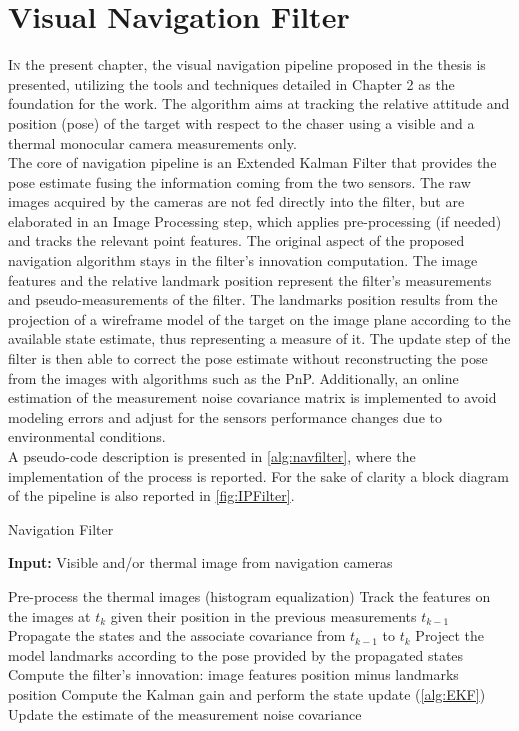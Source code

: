 \chapter{Visual Navigation Filter}
\vspace{-0.3cm}
\lettrine{I}{n} the present chapter, the visual navigation pipeline proposed in the thesis is presented, utilizing the tools and techniques detailed in Chapter 2 as the foundation for the work.
The algorithm aims at tracking the relative attitude and position (pose) of the target with respect to the chaser using a visible and a thermal monocular camera measurements only. \\
The core of navigation pipeline is an Extended Kalman Filter that provides the pose estimate fusing the information coming from the two sensors. The raw images acquired by the cameras are not fed directly into the filter, but are elaborated in an Image Processing step, which applies pre-processing (if needed) and tracks the relevant point features. The original aspect of the proposed navigation algorithm stays in the filter's innovation computation. The image features and the relative landmark position represent the filter's measurements and pseudo-measurements of the filter. The landmarks position results from the projection of a wireframe model of the target on the image plane according to the available state estimate, thus representing a measure of it. The update step of the filter is then able to correct the pose estimate without reconstructing the pose from the images with algorithms such as the PnP. Additionally, an online estimation of the measurement noise covariance matrix is implemented to avoid modeling errors and adjust for the sensors performance changes due to environmental conditions. \\
A pseudo-code description is presented in \cref{alg:navfilter}, where the implementation of the process is reported. For the sake of clarity a block diagram of the pipeline is also reported in \cref{fig:IPFilter}.

\begin{algorithm}[!h]
\caption{Navigation Filter}\label{alg:navfilter}
\hspace*{\algorithmicindent} \textbf{Input:} Visible and/or thermal image from navigation cameras
\begin{algorithmic}[1]
\State Pre-process the thermal images (histogram equalization)
\State Track the features on the images at $t_k$ given their position in the previous measurements  $t_{k-1}$
\State Propagate the states and the associate covariance from $t_{k-1}$ to $t_k$
\State Project the model landmarks according to the pose provided by the propagated states
\State Compute the filter's innovation: image features position minus landmarks position
\State Compute the Kalman gain and perform the state update (\cref{alg:EKF})
\State Update the estimate of the measurement noise covariance
\end{algorithmic}
\end{algorithm}

